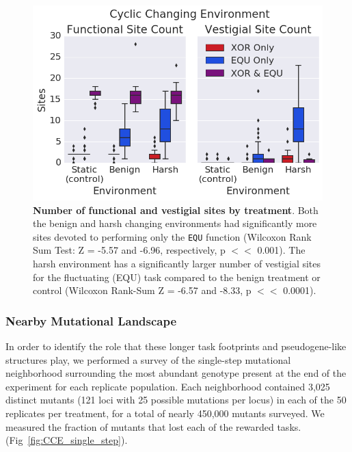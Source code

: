 \documentclass[10pt,letterpaper]{article}
\begin{document}
	\begin{figure}[!h]
	\includegraphics[trim={0 0 0 0}, clip, width=0.75\columnwidth]{figures/CE/CCE_func_vest__box.png}
	\caption{\textbf{Number of functional and vestigial sites by treatment}. Both the benign and harsh changing environments had significantly more sites devoted to performing only the \texttt{EQU} function (Wilcoxon Rank Sum Test: Z = -5.57 and -6.96, respectively, p $<<$ 0.001). The harsh environment has a significantly larger number of vestigial sites for the fluctuating (EQU) task compared to the benign treatment or control (Wilcoxon Rank-Sum Z = -6.57 and -8.33, p $<<$ 0.0001).
	}
	\label{fig:CCE_func_vestigial} %
	\end{figure}

\subsubsection*{Nearby Mutational Landscape}

In order to identify the role that these longer task footprints and pseudogene-like structures play, we performed a survey of the single-step mutational neighborhood surrounding the most abundant genotype present at the end of the experiment for each replicate population. Each neighborhood contained 3,025 distinct mutants (121 loci with 25 possible mutations per locus) in each of the 50 replicates per treatment, for a total of nearly 450,000 mutants surveyed. We measured the fraction of mutants that lost each of the rewarded tasks. (Fig~\ref{fig:CCE_single_step}). 
\end{document}
